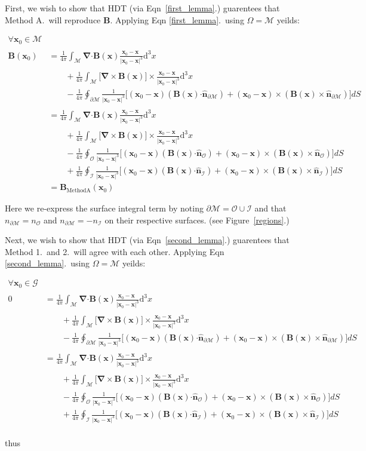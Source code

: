 \documentclass{article}
\newcommand\B{\mathbf{B}}
\newcommand\x{\mathbf{x}}
\newcommand\M{\mathcal{M}}
\newcommand\G{\mathcal{G}}
\newcommand\ifpi{\frac{1}{4\pi}}
\newcommand\dive[1]{\boldsymbol{\nabla} \boldsymbol{\cdot} #1}
\newcommand\curl[1]{\boldsymbol{\nabla} \times #1}
\newcommand\normal[1]{\mathbf{\hat{n}}_{#1}}
\newcommand\dV{\mathrm{d}^3x}
\newcommand\xoverx{\frac{\phantom{|} \x_0-\x \phantom{|^3}}{| \x_0-\x |^3}}
\newcommand\surf[2]{\frac{1}{|\x_0-\x|^3} \Big[(\x_0-\x) (#2 \boldsymbol{\cdot} #1) + (\x_0-\x)\times (#2 \times #1) \Big]}
\newcommand\coulombInt[1]{\ifpi \int_{#1} \dive{\B}(\x) \xoverx \dV}
\newcommand\biotsavInt[1]{\ifpi \int_{#1} \big[ \curl{\B}(\x) \big] \times \xoverx \dV}
\newcommand\surfInt[1]     {\ifpi \oint_{#1} \surf{\normal{#1}}{\B(\x)} dS}
\begin{document}
First, we wish to show that HDT (via Eqn~\ref{first_lemma}.) guarentees that Method A.~will reproduce $\B$.
Applying Eqn \ref{first_lemma}.~using $\Omega=\M$ yeilds:

\begin{align}
\forall \x_0 \in \M \nonumber \\
\B(\x_0) &= \coulombInt{\mathcal{M}} \nonumber \\
            &\qquad + \biotsavInt{\mathcal{M}} \nonumber \\
            &\qquad - \surfInt{\partial \mathcal{M}}  \nonumber \\
         &= \coulombInt{\mathcal{M}} \nonumber \\
            &\qquad + \biotsavInt{\mathcal{M}} \nonumber \\
            &\qquad - \surfInt{\mathcal{O}}  \nonumber \\
            &\qquad + \surfInt{\mathcal{I}}  \nonumber \\
         &= \B_{\text{MethodA}}(\x_0)
\end{align}

Here we re-express the surface integral term
by noting $\partial \mathcal{M} = \mathcal{O} \cup \mathcal{I}$
and that $n_{\partial \mathcal{M}} = n_{\mathcal{O}}$ and $n_{\partial \mathcal{M}} = -n_{\mathcal{I}}$ on their respective surfaces.
(see Figure~\ref{regions}.)

Next, we wish to show that HDT (via Eqn~\ref{second_lemma}.) guarentees that Method 1.~and 2.~will agree with each other.
Applying Eqn \ref{second_lemma}.~using $\Omega=\M$ yeilds:

\begin{align}
\forall \x_0 \in \G \nonumber \\
  0 &= \coulombInt{\mathcal{M}} \nonumber \\
            &\qquad + \biotsavInt{\mathcal{M}} \nonumber \\
            &\qquad - \surfInt{\partial \mathcal{M}}  \nonumber \\
         &= \coulombInt{\mathcal{M}} \nonumber \\
            &\qquad + \biotsavInt{\mathcal{M}} \nonumber \\
            &\qquad - \surfInt{\mathcal{O}}  \nonumber \\
            &\qquad + \surfInt{\mathcal{I}}  \nonumber \\
\end{align}

thus
\end{document}
